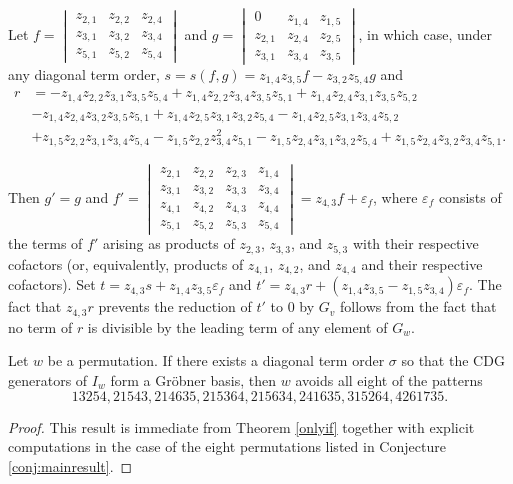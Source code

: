 \documentclass[ALCO,Unicode,published]{cedram}
\begin{document}
\begin{example}
Let $f = \begin{vmatrix} z_{2,1} & z_{2,2} & z_{2,4} \\
z_{3,1} & z_{3,2} & z_{3,4}\\
z_{5,1} & z_{5,2} & z_{5,4}
 \end{vmatrix}$ and $g = \begin{vmatrix} 0 & z_{1,4} & z_{1,5} \\
z_{2,1} & z_{2,4} & z_{2,5}\\
z_{3,1} & z_{3,4} & z_{3,5}
 \end{vmatrix}$, in which case, under any diagonal term order, $s = s(f,g)= z_{1,4}z_{3,5}f-z_{3,2}z_{5,4}g$ and \begin{align*}
r&= -z_{1,4}z_{2,2}z_{3,1}z_{3,5}z_{5,4}+z_{1,4}z_{2,2}z_{3,4}z_{3,5}z_{5,1}+ z_{1,4}z_{2,4}z_{3,1}z_{3,5}z_{5,2}\\
&-z_{1,4}z_{2,4}z_{3,2}z_{3,5}z_{5,1} +z_{1,4}z_{2,5}z_{3,1}z_{3,2}z_{5,4}-z_{1,4}z_{2,5}z_{3,1}z_{3,4}z_{5,2}\\
&+z_{1,5}z_{2,2}z_{3,1}z_{3,4}z_{5,4}-z_{1,5}z_{2,2}z_{3,4}^{2}z_{5,1}-z_{1,5}z_{2,4}z_{3,1}z_{3,2}z_{5,4} +z_{1,5}z_{2,4}z_{3,2}z_{3,4}z_{5,1}.
 \end{align*}
 
 
 Then $g' = g$ and $f' = \begin{vmatrix} z_{2,1} & z_{2,2} & z_{2,3} & z_{1,4}\\
z_{3,1} & z_{3,2} & z_{3,3} & z_{3,4}\\
z_{4,1} & z_{4,2} & z_{4,3} & z_{4,4}\\
z_{5,1} & z_{5,2} & z_{5,3} & z_{5,4}
 \end{vmatrix} = z_{4,3}f+\varepsilon_f$, where $\varepsilon_f$ consists of the terms of $f'$ arising as products of $z_{2,3}$, $z_{3,3}$, and $z_{5,3}$ with their respective cofactors (or, equivalently, products of $z_{4,1}$, $z_{4,2}$, and $z_{4,4}$ and their respective cofactors).  Set $t = z_{4,3}s+z_{1,4}z_{3,5}\varepsilon_f$ and $ t' = z_{4,3}r+(z_{1,4}z_{3,5}-z_{1,5}z_{3,4}) \varepsilon_f$.  The fact that $z_{4,3}r$ prevents the reduction of $t'$ to $0$ by $G_v$ follows from the fact that no term of $r$ is divisible by the leading term of any element of $G_w$.
\end{example}

\begin{corollary}\label{cor:mainOnlyif}
Let $w$ be a permutation. If there exists a diagonal term order $\sigma$ so that the CDG generators of $I_w$ form a Gr\"obner basis, then $w$ avoids all eight of the patterns \[
13254, 21543, 214635, 215364, 215634, 241635, 315264, 4261735.
\]
\end{corollary}
\begin{proof}
This result is immediate from Theorem \ref{onlyif} together with explicit computations in the case of the eight permutations listed in Conjecture \ref{conj:mainresult}.
\end{proof}
\end{document}
